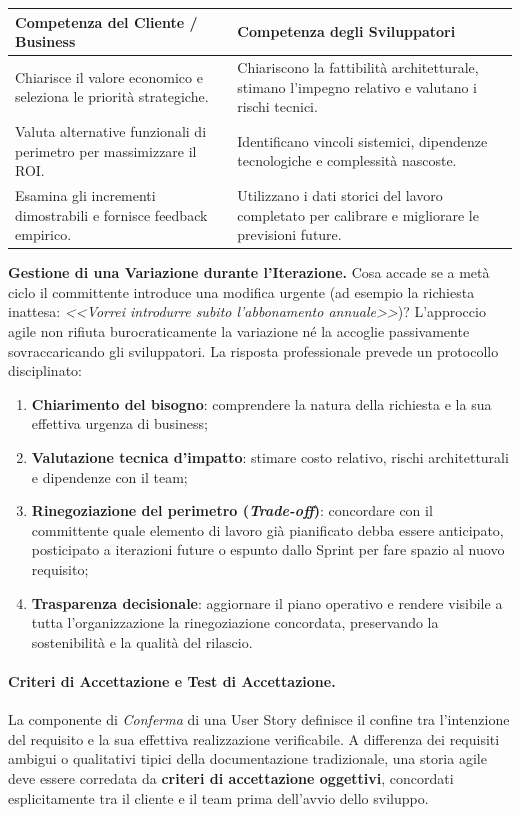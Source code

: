 \documentclass[12pt]{extarticle}
\begin{document}
\begin{center}
\small
\begin{tabular}{p{6.8cm}p{7.6cm}}
    \toprule
    \textbf{Competenza del Cliente / Business} & \textbf{Competenza degli Sviluppatori} \\
    \midrule
    Chiarisce il valore economico e seleziona le priorità strategiche. & Chiariscono la fattibilità architetturale, stimano l'impegno relativo e valutano i rischi tecnici. \\
    \addlinespace
    Valuta alternative funzionali di perimetro per massimizzare il ROI. & Identificano vincoli sistemici, dipendenze tecnologiche e complessità nascoste. \\
    \addlinespace
    Esamina gli incrementi dimostrabili e fornisce feedback empirico. & Utilizzano i dati storici del lavoro completato per calibrare e migliorare le previsioni future. \\
    \bottomrule
\end{tabular}
\end{center}

\noindent \textbf{Gestione di una Variazione durante l'Iterazione.}
Cosa accade se a metà ciclo il committente introduce una modifica urgente (ad esempio la richiesta inattesa: \textit{<<Vorrei introdurre subito l'abbonamento annuale>>})? 
L'approccio agile non rifiuta burocraticamente la variazione né la accoglie passivamente sovraccaricando gli sviluppatori. La risposta professionale prevede un protocollo disciplinato:
\begin{enumerate}
    \item \textbf{Chiarimento del bisogno}: comprendere la natura della richiesta e la sua effettiva urgenza di business;
    \item \textbf{Valutazione tecnica d'impatto}: stimare costo relativo, rischi architetturali e dipendenze con il team;
    \item \textbf{Rinegoziazione del perimetro (\textit{Trade-off})}: concordare con il committente quale elemento di lavoro già pianificato debba essere anticipato, posticipato a iterazioni future o espunto dallo Sprint per fare spazio al nuovo requisito;
    \item \textbf{Trasparenza decisionale}: aggiornare il piano operativo e rendere visibile a tutta l'organizzazione la rinegoziazione concordata, preservando la sostenibilità e la qualità del rilascio.
\end{enumerate}

\paragraph{Criteri di Accettazione e Test di Accettazione.}
La componente di \textit{Conferma} di una User Story definisce il confine tra l'intenzione del requisito e la sua effettiva realizzazione verificabile. A differenza dei requisiti ambigui o qualitativi tipici della documentazione tradizionale, una storia agile deve essere corredata da \textbf{criteri di accettazione oggettivi}, concordati esplicitamente tra il cliente e il team prima dell'avvio dello sviluppo.
\end{document}
